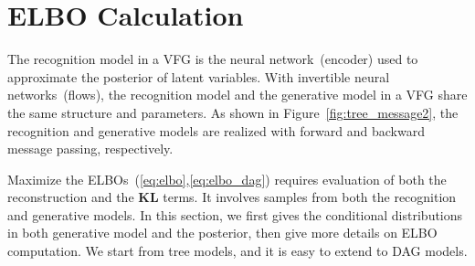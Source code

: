 \documentclass{article}
\begin{document}
\begin{figure}[H]
\begin{center}
{						  
		}
	\end{center}
  \label{fig:mnist_dis}
\end{figure}

\section{ELBO Calculation}\label{sec:vfg_inference}
The recognition model in a VFG is the neural network~(encoder) used to approximate the posterior of latent variables. 
With invertible neural networks~(flows), the recognition model and the generative model in a VFG share the same structure and parameters.  As shown in Figure~\ref{fig:tree_message2},    the recognition and generative models are realized with  forward and backward message passing, respectively.

Maximize the ELBOs~(\ref{eq:elbo},\ref{eq:elbo_dag}) requires evaluation of both the reconstruction and the $\mathbf{KL}$ terms. It involves samples from both the recognition and generative models. In this section, we first gives the conditional distributions in both   generative model and the posterior, then give more details on ELBO computation. We start from tree models, and it is easy to extend to DAG models.
\end{document}
